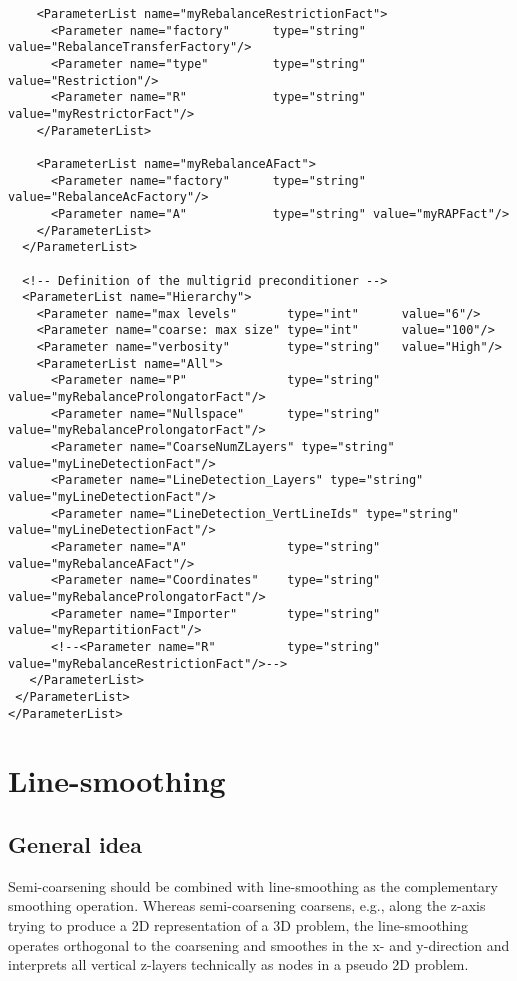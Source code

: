\documentclass[10pt,fleqn]{book}
\begin{document}
\begin{lstlisting}
    <ParameterList name="myRebalanceRestrictionFact">
      <Parameter name="factory"      type="string" value="RebalanceTransferFactory"/>
      <Parameter name="type"         type="string" value="Restriction"/>
      <Parameter name="R"            type="string" value="myRestrictorFact"/>
    </ParameterList>

    <ParameterList name="myRebalanceAFact">
      <Parameter name="factory"      type="string" value="RebalanceAcFactory"/>
      <Parameter name="A"            type="string" value="myRAPFact"/>
    </ParameterList>
  </ParameterList>

  <!-- Definition of the multigrid preconditioner -->
  <ParameterList name="Hierarchy">
    <Parameter name="max levels"       type="int"      value="6"/>
    <Parameter name="coarse: max size" type="int"      value="100"/>
    <Parameter name="verbosity"        type="string"   value="High"/>
    <ParameterList name="All">
      <Parameter name="P"              type="string"   value="myRebalanceProlongatorFact"/>
      <Parameter name="Nullspace"      type="string"   value="myRebalanceProlongatorFact"/>
      <Parameter name="CoarseNumZLayers" type="string"   value="myLineDetectionFact"/>
      <Parameter name="LineDetection_Layers" type="string"   value="myLineDetectionFact"/>
      <Parameter name="LineDetection_VertLineIds" type="string"   value="myLineDetectionFact"/>
      <Parameter name="A"              type="string"   value="myRebalanceAFact"/>
      <Parameter name="Coordinates"    type="string"   value="myRebalanceProlongatorFact"/>
      <Parameter name="Importer"       type="string"   value="myRepartitionFact"/>
      <!--<Parameter name="R"          type="string"   value="myRebalanceRestrictionFact"/>-->
   </ParameterList>
 </ParameterList>
</ParameterList>
\end{lstlisting}

\section{Line-smoothing}
\label{sec:linesmoothing}
\subsection{General idea}
Semi-coarsening should be combined with line-smoothing as the complementary smoothing operation. Whereas semi-coarsening coarsens, e.g., along the z-axis trying to produce a 2D representation of a 3D problem, the line-smoothing operates orthogonal to the coarsening and smoothes in the x- and y-direction and interprets all vertical z-layers technically as nodes in a pseudo 2D problem.
\end{document}
